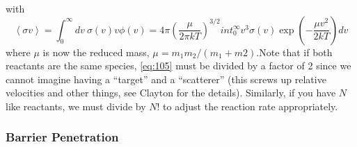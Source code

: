 \documentclass[10pt]{article}
\numberwithin{equation}{section}
\newcommand{\avg}[1]{\left\langle#1\right\rangle}
\begin{document}
  with
  \begin{equation}
    \label{eq:108}
    \avg{\sigma v}=\int_0^\infty dv\
    \sigma(v)v\phi(v)=4\pi\left(\frac{\mu}{2\pi kT}\right)^{3/2}
int_0^\infty v^3\sigma(v)\exp\left(-\frac{\mu v^2}{2kT}\right)dv
  \end{equation}
  where $\mu$ is now the reduced mass, $\mu=m_1m_2/(m_1+m2)$.Note that
  if both reactants are the same species, \eqref{eq:105}
  must be divided by a factor of 2 since we cannot imagine having a
  ``target'' and a ``scatterer'' (this screws up relative velocities
  and other things, see Clayton for the details). Similarly, if you
  have $N$ like reactants, we must divide by $N!$ to adjust the
  reaction rate appropriately. 

  \subsubsection{Barrier Penetration}
  \label{sec:barrier-penetration}
\end{document}
